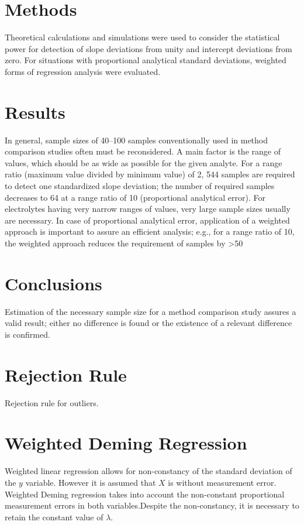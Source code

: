 \documentclass[12pt, a4paper]{report}
\theoremstyle{plain}
\theoremstyle{definition}
\theoremstyle{remark}
\begin{document}
\section{Methods} 
Theoretical calculations and simulations were used to consider the statistical power for detection of slope deviations from 
unity and intercept deviations from zero. For situations with proportional analytical standard deviations, weighted forms of regression analysis were evaluated.

\section{Results} In general, sample sizes of 40–100 samples conventionally used in method comparison studies often must 
be reconsidered. A main factor is the range of values, which should be as wide as possible for the given analyte. 
For a range ratio (maximum value divided by minimum value) of 2, 544 samples are required to detect one standardized slope 
deviation; the number of required samples decreases to 64 at a range ratio of 10 (proportional analytical error). For electrolytes having very narrow ranges of values, very large sample sizes usually are necessary. In case of proportional analytical error, application of a weighted approach is important to assure an efficient analysis; e.g., for a range ratio of 10, the weighted approach reduces the requirement of samples by >50%

\section{Conclusions} Estimation of the necessary sample size for a method comparison study assures a valid result; either no difference is found or the existence of a relevant difference is confirmed.



\section{Rejection Rule}
Rejection rule for outliers.



\section{Weighted Deming Regression}
Weighted linear regression allows for non-constancy of the standard deviation of the $y$ variable. However it is assumed that $X$ is without measurement error. Weighted Deming regression takes into account the non-constant proportional measurement errors in both variables.Despite the non-constancy, it is necessary to retain the constant value of $\lambda$.
\end{document}

